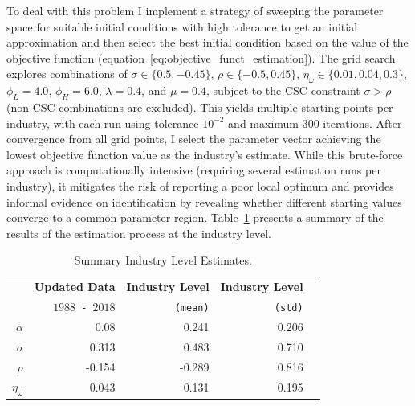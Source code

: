 \documentclass[12pt]{article}
\begin{document}
To deal with this problem I implement a strategy of sweeping the parameter space for suitable initial conditions with high tolerance to get an initial approximation and then select the best initial condition based on the value of the objective function (equation~\eqref{eq:objective_funct_estimation}). The grid search explores combinations of $\sigma \in \{0.5, -0.45\}$, $\rho \in \{-0.5, 0.45\}$, $\eta_\omega \in \{0.01, 0.04, 0.3\}$, $\phi_L = 4.0$, $\phi_H = 6.0$, $\lambda = 0.4$, and $\mu = 0.4$, subject to the CSC constraint $\sigma > \rho$ (non-CSC combinations are excluded). This yields multiple starting points per industry, with each run using tolerance $10^{-2}$ and maximum 300 iterations. After convergence from all grid points, I select the parameter vector achieving the lowest objective function value as the industry's estimate. While this brute-force approach is computationally intensive (requiring several estimation runs per industry), it mitigates the risk of reporting a poor local optimum and provides informal evidence on identification by revealing whether different starting values converge to a common parameter region. Table~\ref{tab:estimation_ind} presents a summary of the results of the estimation process at the industry level.

 \begin{table}[h]
 \begin{center}
 \begin{tabular}{rrrrr}
 \hline\hline
 & \textbf{Updated Data} & \textbf{Industry Level} & \textbf{Industry Level} \\
 & \texttt{$1988$ - $2018$} & \texttt{(mean)} & \texttt{(std)} \\
 \hline
 $\alpha$ & 0.08 & 0.241 & 0.206 \\
 $\sigma$ & 0.313 & 0.483 & 0.710\\
 $\rho$ & -0.154 & -0.289 & 0.816\\
 $\eta_\omega$& 0.043 & 0.131 & 0.195\\
 \hline\hline
 \end{tabular}
\end{center}
\caption{\label{tab:estimation_ind} Summary Industry Level Estimates.}
\end{table}
\end{document}
